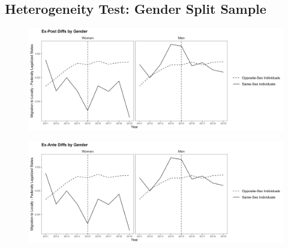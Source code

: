 \documentclass[12pt,letterpaper]{article}
\begin{document}



\subsection{Heterogeneity Test: Gender Split Sample}
\clearpage

\begin{figure}
    \centering
    \includegraphics[width=1\linewidth]{outputs/summary_stats/sex_post_diffs.png}
    \label{fig:enter-label}
\end{figure}

\centering
\tiny


\begin{figure}
    \centering
    \includegraphics[width=1\linewidth]{outputs/summary_stats/sex_ante_diffs.png}
    \label{fig:enter-label}
\end{figure}

\centering
\tiny


\end{document}

